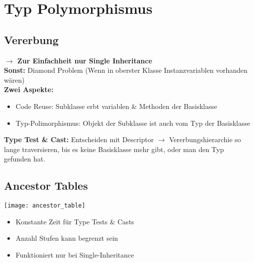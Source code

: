 
\section{Typ Polymorphismus}
\subsection{Vererbung}
\textbf{$\rightarrow$ Zur Einfachheit nur Single Inheritance}\\
\textbf{Sonst:} Diamond Problem (Wenn in oberster Klasse Instanzvariablen vorhanden wären)\\
\textbf{Zwei Aspekte:}
\begin{itemize}[topsep=0pt]
    \itemsep -0.2em
    \item Code Reuse: Subklasse erbt variablen \& Methoden der Basisklasse
    \item Typ-Polimorphismus: Objekt der Subklasse ist auch vom Typ der Basisklasse
\end{itemize}
\textbf{Type Test \& Cast:} Entscheiden mit Descriptor $\rightarrow$ Vererbungshierarchie so lange traversieren, bis es keine Basisklasse mehr gibt, oder man den Typ gefunden hat.\\

\subsection{Ancestor Tables}
\begin{minipage}{0.5\linewidth}
    \texttt{[image: ancestor\_table]}
\end{minipage}
\begin{minipage}{0.5\linewidth}
    \begin{itemize}
        \item Konstante Zeit für Type Tests \& Casts
        \item Anzahl Stufen kann begrenzt sein
        \item Funktioniert nur bei Single-Inheritance
    \end{itemize}
\end{minipage}


